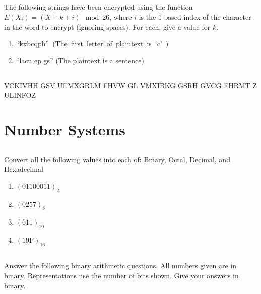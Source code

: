 \documentclass[twocolumn]{article}
\newcommand\mrk[1]{}
\begin{document}
\subsection{}

    The following strings have been encrypted using the function $E(X_i) = (X + k + i) \mod 26$, where $i$ is the 1-based index of the character in the word to encrypt (ignoring spaces). For each, give a value for $k$.

    \begin{enumerate}
        \item \mbox{``kxbcqph'' (The first letter of plaintext is `c' ) \mrk{1}}
        \item ``lacn ep gs'' (The plaintext is a sentence) \mrk{1}
    \end{enumerate}

\subsection{}

VCKIVHH GSV UFMXGRLM FHVW GL VMXIBKG GSRH GVCG FHRMT Z ULINFOZ \mrk{2}

\clearpage
\section{Number Systems}

\subsection{}

    Convert all the following values into each of: Binary, Octal, Decimal, and Hexadecimal

    \begin{enumerate}
        \item $ ( 01100011 )_2 $ \mrk{1}
        \item $ ( 0257)_8 $ \mrk{1}
        \item $ ( 611 )_{10} $ \mrk{1}
        \item $ ( 19\text{F} )_{16} $ \mrk{1}
    \end{enumerate}

\subsection{}

    Answer the following binary arithmetic questions. All numbers given are in binary. Representations use the number of bits shown. Give your answers in binary.
\end{document}

